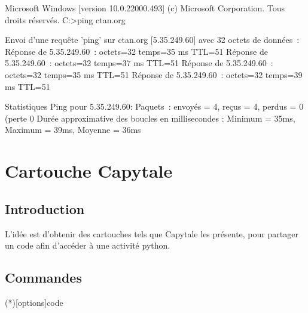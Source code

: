 \documentclass{article}
\begin{document}
\begin{codesortie}
\begin{PLtermwin}[15cm]{}
Microsoft Windows [version 10.0.22000.493]
(c) Microsoft Corporation. Tous droits réservés.
C:\Users\test>ping ctan.org

Envoi d’une requête 'ping' sur ctan.org [5.35.249.60] avec 32 octets de données :
Réponse de 5.35.249.60 : octets=32 temps=35 ms TTL=51
Réponse de 5.35.249.60 : octets=32 temps=37 ms TTL=51
Réponse de 5.35.249.60 : octets=32 temps=35 ms TTL=51
Réponse de 5.35.249.60 : octets=32 temps=39 ms TTL=51

Statistiques Ping pour 5.35.249.60:
Paquets : envoyés = 4, reçus = 4, perdus = 0 (perte 0%
Durée approximative des boucles en millisecondes :
Minimum = 35ms, Maximum = 39ms, Moyenne = 36ms
\end{PLtermwin}


\end{codesortie}

\newpage

\section{Cartouche Capytale}

\subsection{Introduction}

\begin{codeidee}
L'idée est d'obtenir des \textsf{cartouches} tels que \textsf{Capytale} les présente, pour partager un code afin d'accéder à une activité \textsf{python}.
\end{codeidee}

\subsection{Commandes}

\begin{codetex}
\liencapytale(*)[options]{code}
\end{codetex}
\end{document}
